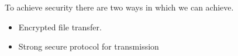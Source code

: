 \documentclass[12pt,journal,compsoc]{IEEEtran}
\begin{document}
%
%


%





To achieve security there are two ways in which we can achieve.
\begin{itemize}
	\item Encrypted file transfer.
	\item Strong secure protocol for transmission
\end{itemize}
\end{document}
